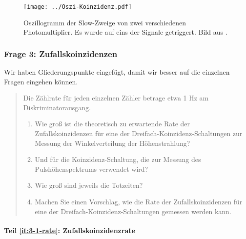 \documentclass[11pt, ngerman, fleqn, DIV=15, headinclude, BCOR=2cm]{scrreprt}
\begin{document}
\begin{figure}[htbp]
    \centering
    \texttt{[image: ../Oszi-Koinzidenz.pdf]}
    \caption{%
        Oszillogramm der Slow-Zweige von zwei verschiedenen Photomultiplier. Es
        wurde auf eins der Signale getriggert. Bild aus
        \parencite[Abbildung~2.24]{Ueding/525}.
    }
    \label{fig:oszi-koinzidenz}
\end{figure}


\subsubsection{Frage 3: Zufallskoinzidenzen}

Wir haben Gliederungspunkte eingefügt, damit wir besser auf die einzelnen
Fragen eingehen können.

\begin{quote}
    Die Zählrate für jeden einzelnen Zähler betrage etwa 1 Hz am
    Diskriminatorausgang.
    \begin{enumerate}
        \item
            \label{it:3-1-rate}
            Wie groß ist die theoretisch zu erwartende Rate der
            Zufallskoinzidenzen für eine der Dreifach-Koinzidenz-Schaltungen
            zur Messung der Winkelverteilung der Höhenstrahlung?

        \item
            \label{it:3-1-puls}
            Und für die Koinzidenz-Schaltung, die zur Messung des
            Pulshöhenspektrums verwendet wird?

        \item
            \label{it:3-1-tot}
            Wie groß sind jeweils die Totzeiten? 

        \item
            \label{it:3-1-vorschlag}
            Machen Sie einen Vorschlag, wie die Rate der Zufallskoinzidenzen
            für eine der Dreifach-Koinzidenz-Schaltungen gemessen werden kann.
    \end{enumerate}
\end{quote}

\paragraph{Teil \ref{it:3-1-rate}: Zufallskoinzidenzrate}

\newcommand\DtM{\Deltaup t_\text M}
\newcommand\DtO{\Deltaup t_\text O}
\newcommand\DtU{\Deltaup t_\text U}
\end{document}
